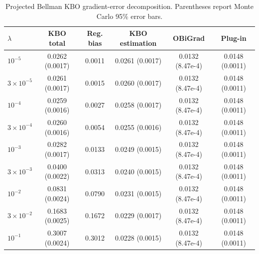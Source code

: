 \begin{table}[t]
\centering
\small
\setlength{\tabcolsep}{5pt}
\caption{Projected Bellman KBO gradient-error decomposition. Parentheses report Monte Carlo 95\% error bars.}
\label{tab:generated-bellman-b4-kbo}
\begin{tabular}{lccccc}
\toprule
$\lambda$ & KBO total & Reg. bias & KBO estimation & OBiGrad & Plug-in \\
\midrule
$10^{-5}$ & 0.0262 (0.0017) & 0.0011 & 0.0261 (0.0017) & 0.0132 (8.47e-4) & 0.0148 (0.0011) \\
$3\times 10^{-5}$ & 0.0261 (0.0017) & 0.0015 & 0.0260 (0.0017) & 0.0132 (8.47e-4) & 0.0148 (0.0011) \\
$10^{-4}$ & 0.0259 (0.0016) & 0.0027 & 0.0258 (0.0017) & 0.0132 (8.47e-4) & 0.0148 (0.0011) \\
$3\times 10^{-4}$ & 0.0260 (0.0016) & 0.0054 & 0.0255 (0.0016) & 0.0132 (8.47e-4) & 0.0148 (0.0011) \\
$10^{-3}$ & 0.0282 (0.0017) & 0.0133 & 0.0249 (0.0015) & 0.0132 (8.47e-4) & 0.0148 (0.0011) \\
$3\times 10^{-3}$ & 0.0400 (0.0022) & 0.0313 & 0.0240 (0.0015) & 0.0132 (8.47e-4) & 0.0148 (0.0011) \\
$10^{-2}$ & 0.0831 (0.0024) & 0.0790 & 0.0231 (0.0015) & 0.0132 (8.47e-4) & 0.0148 (0.0011) \\
$3\times 10^{-2}$ & 0.1683 (0.0025) & 0.1672 & 0.0229 (0.0017) & 0.0132 (8.47e-4) & 0.0148 (0.0011) \\
$10^{-1}$ & 0.3007 (0.0024) & 0.3012 & 0.0228 (0.0015) & 0.0132 (8.47e-4) & 0.0148 (0.0011) \\
\bottomrule
\end{tabular}
\end{table}
